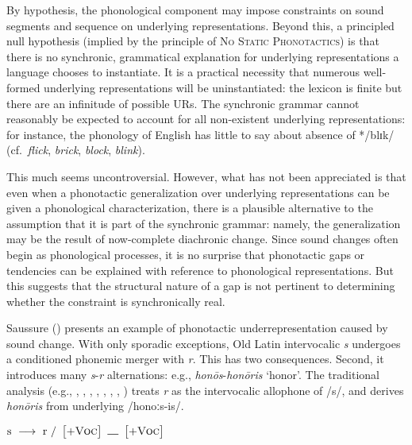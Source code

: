 By hypothesis, the phonological component may impose constraints on sound segments and sequence on underlying representations.
Beyond this, 
a principled null hypothesis (implied by the principle of \textsc{No Static Phonotactics}) is that there is no synchronic, grammatical explanation for underlying representations a language chooses to instantiate.
It is a practical necessity that numerous well-formed underlying representations will be uninstantiated: the lexicon is finite but there are an infinitude of possible URs.
The synchronic grammar cannot reasonably be expected to account for all non-existent underlying representations: for instance, the phonology of English has little to say about absence of */blɪk/ (cf.~\emph{flick}, \emph{brick}, \emph{block}, \emph{blink}).

This much seems uncontroversial.
However, what has not been appreciated is that even when a phonotactic generalization over underlying representations can be given a phonological characterization, there is a plausible alternative to the assumption that it is part of the synchronic grammar: namely, the generalization may be the result of now-complete diachronic change.
Since sound changes often begin as phonological processes, it is no surprise that phonotactic gaps or tendencies can be explained with reference to phonological representations.
But this suggests that the structural nature of a gap is not pertinent to determining whether the constraint is synchronically real.

Saussure (\citeyear{CLG}) presents an example of phonotactic underrepresentation caused by sound change.
With only sporadic exceptions, Old Latin intervocalic \emph{s} undergoes a conditioned phonemic merger with \emph{r}.
This has two consequences.
Second, it introduces many \emph{s}-\emph{r} alternations: e.g., \emph{honōs}-\emph{honōris} `honor'.
The traditional analysis (e.g., \citealt[62]{Foley1965}, \citealt[142]{Gruber2006}, \citealt[134]{Heslin1987}, \citealt[377]{Kenstowicz1996}, \citealt[314]{Klausenburger1976}, \citealt[19]{Matthews1972a}, \citealt[88]{Roberts2012}, \citealt[526]{Watkins1970}) treats \emph{r} as the intervocalic allophone of /s/, and derives \emph{honōris} from underlying /honoːs-is/.
 
\begin{example}
$\textrm{s}~\goesto~\textrm{r}~/~\begin{bmatrix} +\textsc{Voc} \end{bmatrix}~\gap~\begin{bmatrix} +\textsc{Voc} \end{bmatrix}$
\end{example}

